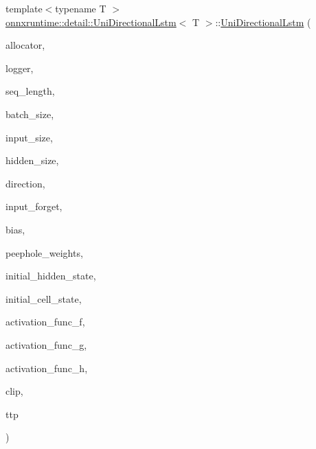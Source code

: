 {\footnotesize\ttfamily template$<$typename T $>$ \\
\mbox{\hyperlink{classonnxruntime_1_1detail_1_1UniDirectionalLstm}{onnxruntime\+::detail\+::\+Uni\+Directional\+Lstm}}$<$ T $>$\+::\mbox{\hyperlink{classonnxruntime_1_1detail_1_1UniDirectionalLstm}{Uni\+Directional\+Lstm}} (\begin{DoxyParamCaption}\item[{\mbox{\hyperlink{namespaceonnxruntime_a6cdac724c5dcefded3a63f08dae58fda}{Allocator\+Ptr}}}]{allocator,  }\item[{const \mbox{\hyperlink{classonnxruntime_1_1logging_1_1Logger}{logging\+::\+Logger}} \&}]{logger,  }\item[{const int}]{seq\+\_\+length,  }\item[{const int}]{batch\+\_\+size,  }\item[{const int}]{input\+\_\+size,  }\item[{const int}]{hidden\+\_\+size,  }\item[{\mbox{\hyperlink{namespaceonnxruntime_1_1rnn_1_1detail_a3a4cfb298df0a68436cdb8879647de1d}{Direction}}}]{direction,  }\item[{const bool}]{input\+\_\+forget,  }\item[{const gsl\+::span$<$ const T $>$ \&}]{bias,  }\item[{const gsl\+::span$<$ const T $>$ \&}]{peephole\+\_\+weights,  }\item[{const gsl\+::span$<$ const T $>$ \&}]{initial\+\_\+hidden\+\_\+state,  }\item[{const gsl\+::span$<$ const T $>$ \&}]{initial\+\_\+cell\+\_\+state,  }\item[{const \mbox{\hyperlink{structonnxruntime_1_1rnn_1_1detail_1_1ActivationFuncs_1_1Entry}{Activation\+Funcs\+::\+Entry}} \&}]{activation\+\_\+func\+\_\+f,  }\item[{const \mbox{\hyperlink{structonnxruntime_1_1rnn_1_1detail_1_1ActivationFuncs_1_1Entry}{Activation\+Funcs\+::\+Entry}} \&}]{activation\+\_\+func\+\_\+g,  }\item[{const \mbox{\hyperlink{structonnxruntime_1_1rnn_1_1detail_1_1ActivationFuncs_1_1Entry}{Activation\+Funcs\+::\+Entry}} \&}]{activation\+\_\+func\+\_\+h,  }\item[{const float}]{clip,  }\item[{\mbox{\hyperlink{classonnxruntime_1_1TaskThreadPool}{Task\+Thread\+Pool}} \&}]{ttp }\end{DoxyParamCaption})}

\mbox{\label{classonnxruntime_1_1detail_1_1UniDirectionalLstm_a89f068ebc2f0614ffc238e0d6f7fe086}} 
